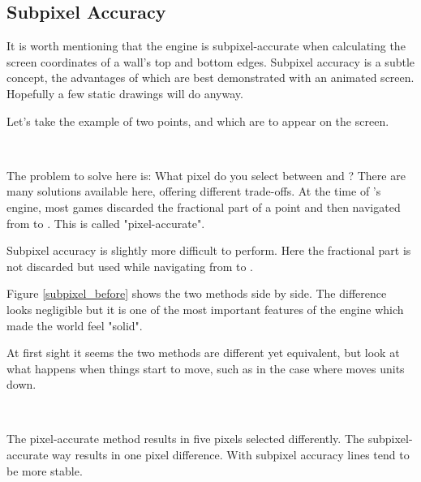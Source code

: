 \subsection{Subpixel Accuracy}
It is worth mentioning that the engine is subpixel-accurate when calculating the screen coordinates of a wall's top and bottom edges. Subpixel accuracy is a subtle concept, the advantages of which are best demonstrated with an animated screen. Hopefully a few static drawings will do anyway.\\
\par
 Let's take the example of two points,  and  which are to appear on the screen.\\
 \par
{}\\
\par
The problem to solve here is: What pixel do you select between  and ? There are many solutions available here, offering different trade-offs. At the time of \doom{}'s engine, most games discarded the fractional part of a point and then navigated from  to . This is called "pixel-accurate".\\
\par
Subpixel accuracy is slightly more difficult to perform. Here the fractional part is not discarded but used while navigating from  to .\\
\par
Figure \ref{subpixel_before} shows the two methods side by side. The difference looks negligible but it is one of the most important features of the engine which made the world feel "solid".
\\
\par
At first sight it seems the two methods are different yet equivalent, but look at what happens when things start to move, such as in the case where  moves  units down.\\
\par
{}\\
\par
The pixel-accurate method results in five pixels selected differently. The subpixel-accurate way results in one pixel difference. With subpixel accuracy lines tend to be more stable.\\
\par 








